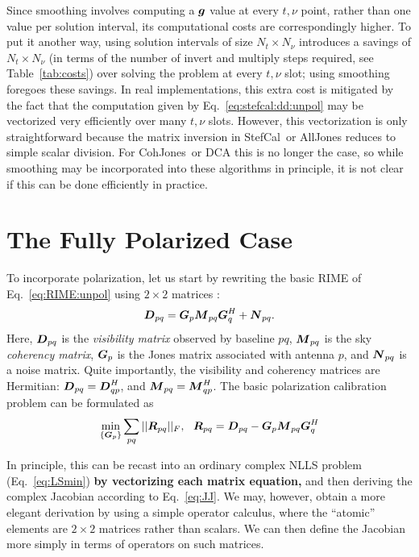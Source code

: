 \documentclass[useAMS,usenatbib]{mn2e}
\newcommand{\vecg}{\bmath{g}}
\newcommand{\mat}[1]{{\bmath{#1}}}
\newcommand{\DD}{\mat{D}}
\newcommand{\MM}{\mat{M}}
\newcommand{\RR}{\mat{R}}
\newcommand{\GG}{\mat{G}}
\newcommand{\COH}{{\sc CohJones}}
\newcommand{\StefCal}{{\sc StefCal}}
\numberwithin{equation}{section} %
\begin{document}
Since smoothing involves computing a $\vecg$ value at every $t,\nu$ point, rather than one value per
solution interval, its computational costs are correspondingly higher. To put it another way, using solution intervals of 
size $N_t\times N_\nu$ introduces a savings of $N_t\times N_\nu$ (in terms of the number of invert and multiply steps required, see 
Table~\ref{tab:costs}) over solving the problem at every $t,\nu$ slot; using smoothing foregoes these savings.
In real implementations, this extra cost is mitigated 
by the fact that  the computation given by Eq.~\ref{eq:stefcal:dd:unpol} may be vectorized very efficiently over many $t,\nu$ slots.
However, this vectorization is only straightforward because the matrix inversion in \StefCal\ or {\sc AllJones} reduces to simple 
scalar division.  For \COH\ or DCA this is no longer the case, so while smoothing may be incorporated into these algorithms 
in principle, it is not clear if this can be done efficiently in practice.

\section{The Fully Polarized Case}
\label{sec:pol}

To incorporate polarization, let us start by rewriting the basic RIME of Eq.~\ref{eq:RIME:unpol} using $2\times 2$ matrices 
\citep[a full derivation may be found in][]{RRIME1}:
\begin{equation}
\label{eq:RIME:pol}
\DD_{pq} = \GG_p \MM_{pq} \GG^H_q + \mat{N}_{pq}.
\end{equation}
Here, $\DD_{pq}$ is the \emph{visibility matrix} observed by baseline $pq$, $\MM_{pq}$ is the sky \emph{coherency matrix}, $\GG_p$ is the Jones matrix associated with antenna $p$, and $\mat{N}_{pq}$ is a noise matrix. Quite importantly, the visibility and coherency matrices are Hermitian: 
$\DD_{pq}=\DD^H_{qp}$, and $\MM_{pq}=\MM^H_{qp}$. The basic polarization calibration problem can be formulated as
\begin{equation}
\label{eq:cal:DI:pol}
\min_{\{\GG_p\}}\sum_{pq}||\RR_{pq}||_F,~~
\RR_{pq} = \DD_{pq}-\GG_p \MM_{pq} \GG^H_q
\end{equation}

In principle, this can be recast into an ordinary complex NLLS problem (Eq.~\ref{eq:LSmin}) {\bf by vectorizing each 
matrix equation,} and then deriving the complex Jacobian according to Eq.~\ref{eq:JJ}. We may, however, 
obtain a more elegant derivation by using a simple operator calculus, where the ``atomic'' elements are $2\times2$ matrices 
rather than scalars. We can then define the Jacobian more simply in terms of operators on such matrices. 
\end{document}
